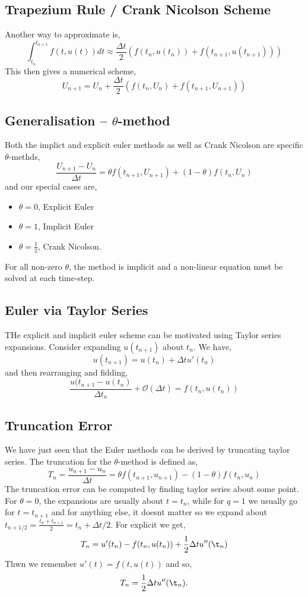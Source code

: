 \subsection{Trapezium Rule / Crank Nicolson Scheme}
Another way to approximate is,
$$ \int_{t_n}^{t_{n+1}} f(t, u(t))dt \approx \frac{\Delta t}{2} (f(t_n, u(t_n)) + f(t_{n+1}, u(t_{n+1}))) $$
This then gives a numerical scheme,
$$ U_{n+1} = U_n + \frac{\Delta t}{2} (f(t_n, U_n) + f(t_{n+1}, U_{n+1})) $$

\subsection{Generalisation -- $\theta$-method}
Both the implict and explicit euler methods as well as Crank Nicolson are specific $\theta$-methds,
$$ \frac{U_{n+1} - U_n}{\Delta t} = \theta f(t_{n+1}, U_{n+1}) + (1 - \theta)f(t_n, U_n) $$
and our special cases are,
\begin{itemize}
  \item $\theta = 0$, Explicit Euler
  \item $\theta = 1$, Implicit Euler
  \item $\theta = \frac{1}{2}$, Crank Nicolson.
\end{itemize}
For all non-zero $\theta$, the method is implicit and a non-linear equation must be solved at each time-step.

\subsection{Euler via Taylor Series}
THe explicit and implicit euler scheme can be motivated using Taylor series expansions. Consider expanding $u(t_{n+1})$ about $t_n$. We have,
$$ u(t_{n+1}) = u(t_n) + \Delta tu'(t_n) $$
and then rearranging and fidding,
$$ \frac{u(t_{n+1} - u(t_n)}{\Delta t_n} + \mathcal{O}(\Delta t) = f(t_n, u(t_n))$$

\subsection{Truncation Error}
We have just seen that the Euler methods can be derived by truncating taylor series. The truncation for the $\theta$-method is defined as,
$$ T_n = \frac{u_{n+1} - u_n}{\Delta t} = \theta f(t_{n+1}, u_{n+1}) - (1 - \theta)f(t_n, u_n) $$
The truncation error can be computed by finding taylor series about some point. For $\theta = 0$, the expansions are usually about $t  =t_n$, while for $q = 1$ we usually go for $t = t_{n+1}$ and for anything else, it doesnt matter so we expand about $t_{n+1/2} = \frac{t_n + t_{n+1}}{2} = t_{n} + \Delta t/2$. For explicit we get,
$$ T_n = u'(t_n) - f(t_n, u(t_n)) + \frac{1}{2}\Delta t u''(\t_n) $$
Thwn we remember $u'(t) = f(t, u(t))$ and so,
$$ T_n = \frac{1}{2}\Delta t u''(\t_n). $$

